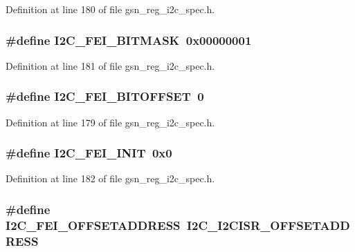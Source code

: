 Definition at line 180 of file gsn\_\-reg\_\-i2c\_\-spec.h.

\hypertarget{a00558_a826bcc0dbd1ca1ab559ed81876a020fd}{
\subsubsection[{I2C\_\-FEI\_\-BITMASK}]{\setlength{\rightskip}{0pt plus 5cm}\#define I2C\_\-FEI\_\-BITMASK~0x00000001}}
\label{a00558_a826bcc0dbd1ca1ab559ed81876a020fd}


Definition at line 181 of file gsn\_\-reg\_\-i2c\_\-spec.h.

\hypertarget{a00558_afeb33abd8f316d77f5e182815019877b}{
\subsubsection[{I2C\_\-FEI\_\-BITOFFSET}]{\setlength{\rightskip}{0pt plus 5cm}\#define I2C\_\-FEI\_\-BITOFFSET~0}}
\label{a00558_afeb33abd8f316d77f5e182815019877b}


Definition at line 179 of file gsn\_\-reg\_\-i2c\_\-spec.h.

\hypertarget{a00558_a74e1bb2b9eabe13cf6d7d108f71e6a1b}{
\subsubsection[{I2C\_\-FEI\_\-INIT}]{\setlength{\rightskip}{0pt plus 5cm}\#define I2C\_\-FEI\_\-INIT~0x0}}
\label{a00558_a74e1bb2b9eabe13cf6d7d108f71e6a1b}


Definition at line 182 of file gsn\_\-reg\_\-i2c\_\-spec.h.

\hypertarget{a00558_ad2731c220555c15d73aa57cfead6bac7}{
\subsubsection[{I2C\_\-FEI\_\-OFFSETADDRESS}]{\setlength{\rightskip}{0pt plus 5cm}\#define I2C\_\-FEI\_\-OFFSETADDRESS~I2C\_\-I2CISR\_\-OFFSETADDRESS}}
\label{a00558_ad2731c220555c15d73aa57cfead6bac7}


